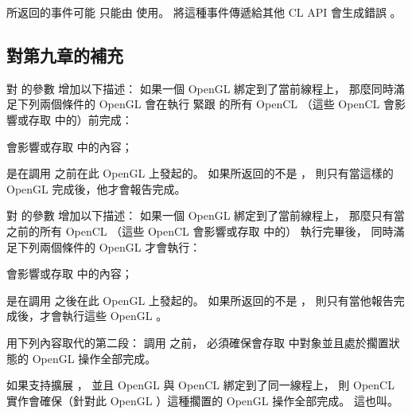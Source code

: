  所返回的事件可能
只能由  使用。
將這種事件傳遞給其他 CL API 會生成錯誤 。
\stopreplacepar %

\subsection{對第九章的補充}

對  的參數  增加以下描述：
\startreplacepar
如果一個 OpenGL 綁定到了當前線程上，
那麼同時滿足下列兩個條件的 OpenGL 會在執行
緊跟  的所有 OpenCL 
（這些 OpenCL 會影響或存取  中的）前完成：
\startigNum[indentnext=no]
\item 會影響或存取  中的內容；
\item 是在調用  之前在此 OpenGL 上發起的。
\stopigNum
如果所返回的不是 ，
則只有當這樣的 OpenGL 完成後，他才會報告完成。
\stopreplacepar

對  的參數  增加以下描述：
\startreplacepar
如果一個 OpenGL 綁定到了當前線程上，
那麼只有當  之前的所有 OpenCL 
（這些 OpenCL 會影響或存取  中的）
執行完畢後，
同時滿足下列兩個條件的 OpenGL 才會執行：
\startigNum[indentnext=no]
\item 會影響或存取  中的內容；
\item 是在調用  之後在此 OpenGL 上發起的。
\stopigNum
如果所返回的不是 ，
則只有當他報告完成後，才會執行這些 OpenGL 。
\stopreplacepar

用下列內容取代的第二段：
\startreplacepar
調用  之前，
必須確保會存取  中對象並且處於擱置狀態的 OpenGL 操作全部完成。

如果支持擴展 ，
並且 OpenGL 與 OpenCL 綁定到了同一線程上，
則 OpenCL 實作會確保（針對此 OpenGL ）這種擱置的 OpenGL 操作全部完成。
這也叫{}。

